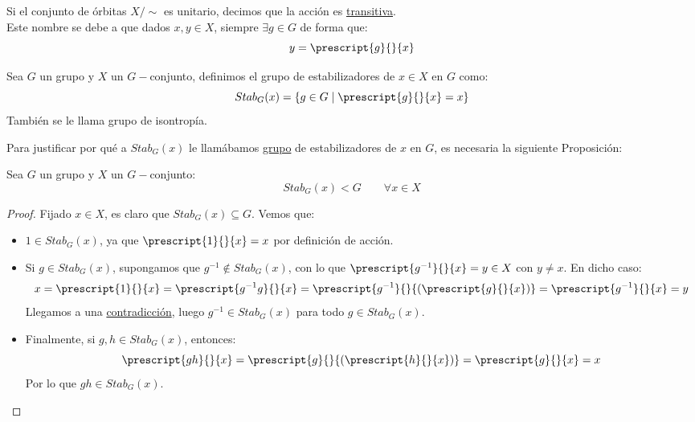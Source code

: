 \begin{definicion}
    Si el conjunto de órbitas $X/\sim$ es unitario, decimos que la acción es \underline{transitiva}.\\

    \noindent
    Este nombre se debe a que dados $x,y\in X$, siempre $\exists g\in G$ de forma que:
    \begin{equation*}
        y = \prescript{g}{}{x}
    \end{equation*}
\end{definicion}

\begin{definicion}[Estabilizador]
    Sea $G$ un grupo y $X$ un $G-$conjunto, definimos el grupo de estabilizadores de $x\in X$ en $G$ como:
    \begin{equation*}
        Stab_G(x) = \{g\in G \mid \prescript{g}{}{x} = x\}
    \end{equation*}
    También se le llama grupo de isontropía.
\end{definicion}

\noindent
Para justificar por qué a $Stab_G(x)$ le llamábamos \underline{grupo} de estabilizadores de $x$ en $G$, es necesaria la siguiente Proposición:
\begin{prop}
    Sea $G$ un grupo y $X$ un $G-$conjunto:
    \begin{equation*}
        Stab_G(x) < G \qquad \forall x\in X
    \end{equation*}
    \begin{proof}
        Fijado $x\in X$, es claro que $Stab_G(x) \subseteq G$. Vemos que:
        \begin{itemize}
            \item $1\in Stab_G(x)$, ya que $\prescript{1}{}{x} = x$ por definición de acción.
            \item Si $g\in Stab_G(x)$, supongamos que $g^{-1}\notin Stab_G(x)$, con lo que $\prescript{g^{-1}}{}{x} = y \in X$ con $y\neq x$. En dicho caso:
                \begin{equation*}
                    x = \prescript{1}{}{x} = \prescript{g^{-1}g}{}{x} = \prescript{g^{-1}}{}{(\prescript{g}{}{x})} = \prescript{g^{-1}}{}{x} = y
                \end{equation*}
                Llegamos a una \underline{contradicción}, luego $g^{-1}\in Stab_G(x)$ para todo $g\in Stab_G(x)$.
            \item Finalmente, si $g,h\in Stab_G(x)$, entonces:
                \begin{equation*}
                    \prescript{gh}{}{x} = \prescript{g}{}{(\prescript{h}{}{x})} = \prescript{g}{}{x} = x
                \end{equation*}
                Por lo que $gh \in Stab_G(x)$.
        \end{itemize}
    \end{proof}
\end{prop}

